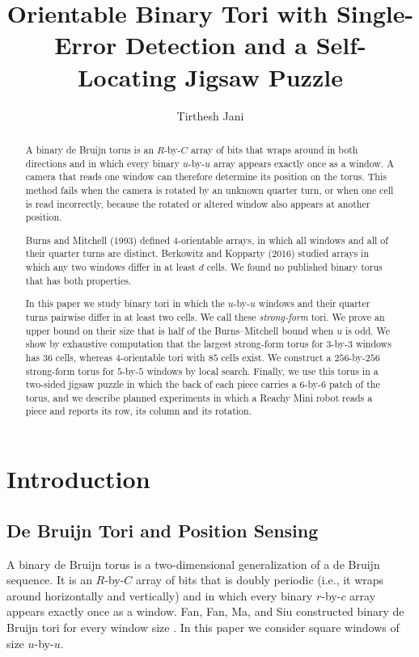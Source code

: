 \documentclass{lipics-v2021}
\title{Orientable Binary Tori with Single-Error Detection and a Self-Locating Jigsaw Puzzle}
\author{Tirthesh Jani}{Lakehead University, Canada}{tjani@lakeheadu.ca}{}{}
\begin{document}
\maketitle

\begin{abstract}
A binary de Bruijn torus is an $R$-by-$C$ array of bits that wraps around in both directions and in which every binary $u$-by-$u$ array appears exactly once as a window.
A camera that reads one window can therefore determine its position on the torus.
This method fails when the camera is rotated by an unknown quarter turn, or when one cell is read incorrectly, because the rotated or altered window also appears at another position.

Burns and Mitchell (1993) defined 4-orientable arrays, in which all windows and all of their quarter turns are distinct.
Berkowitz and Kopparty (2016) studied arrays in which any two windows differ in at least $d$ cells.
We found no published binary torus that has both properties.

In this paper we study binary tori in which the $u$-by-$u$ windows and their quarter turns pairwise differ in at least two cells.
We call these \emph{strong-form} tori.
We prove an upper bound on their size that is half of the Burns--Mitchell bound when $u$ is odd.
We show by exhaustive computation that the largest strong-form torus for $3$-by-$3$ windows has $36$ cells, whereas 4-orientable tori with $85$ cells exist.
We construct a $256$-by-$256$ strong-form torus for $5$-by-$5$ windows by local search.
Finally, we use this torus in a two-sided jigsaw puzzle in which the back of each piece carries a $6$-by-$6$ patch of the torus, and we describe planned experiments in which a Reachy Mini robot reads a piece and reports its row, its column and its rotation.
\end{abstract}


\section{Introduction}
\label{sec:intro}

\subsection{De Bruijn Tori and Position Sensing}
\label{sec:intro_tori}

A binary de Bruijn torus is a two-dimensional generalization of a de Bruijn sequence.
It is an $R$-by-$C$ array of bits that is doubly periodic (i.e., it wraps around horizontally and vertically) and in which every binary $r$-by-$c$ array appears exactly once as a window.
Fan, Fan, Ma, and Siu constructed binary de Bruijn tori for every window size \cite{fan85debruijn}.
In this paper we consider square windows of size $u$-by-$u$.
\end{document}
